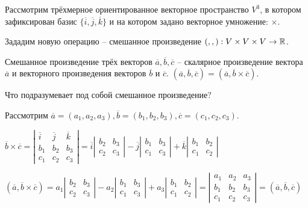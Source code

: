 	Рассмотрим трёхмерное ориентированное векторное пространство $V^3$, в котором зафиксирован базис $\{\overline{i}, \overline{j}, \overline{k}\}$ и на котором задано векторное умножение: $\times$.

	Зададим новую операцию -- смешанное произведение $(,,): V \times V \times V \to \mathbb{R}$. 

	\begin{Def}
		Смешанное произведение трёх векторов $\overline{a}, \overline{b}, \overline{c}$ -- скалярное произведение вектора $\overline{a}$ и векторного произведения векторов $\overline{b}$ и $\overline{c}$. $(\overline{a}, \overline{b}, \overline{c}) = (\overline{a}, \overline{b} \times \overline{c}).$
	\end{Def}

	\begin{Example}
		Что подразумевает под собой смешанное произведение?
		
		Рассмотрим $\overline{a} = (a_1, a_2, a_3), \overline{b} = (b_1, b_2, b_3), \overline{c} = (c_1, c_2, c_3) $.
		
		$\overline{b} \times \overline{c} = 
		\left|\begin{array}{cccc}
			\overline{i}  & \overline{j}  & \overline{k}  \\ 
			b_1 &  b_2 & b_3 \\ 
			c_1 & c_2 & c_3
			\end{array}\right| = \overline{i} 
		\left|\begin{array}{cccc}
			b_2 & b_3 \\ 
			c_2 & c_3
			\end{array}\right| - \overline{j}
		\left|\begin{array}{cccc}
			b_1 & b_3 \\ 
			c_1 & c_3
			\end{array}\right| + \overline{k}
		\left|\begin{array}{cccc}
			b_1 & b_2 \\ 
			c_1 & c_2
			\end{array}\right| $
		
			$(\overline{a}, \overline{b} \times \overline{c}) = a_1
		\left|\begin{array}{cccc}
		b_2 & b_3 \\ 
		c_2 & c_3
		\end{array}\right| - 
		a_2 \left|\begin{array}{cccc}
			b_1 & b_3 \\ 
			c_1 & c_3
			\end{array}\right| + 
		a_3  \left|\begin{array}{cccc}
			b_1 & b_2 \\ 
			c_1 & c_2
			\end{array}\right| = 
		\left|\begin{array}{cccc}
			a_1  & a_2  & a_3  \\ 
			b_1 &  b_2 & b_3 \\ 
			c_1 & c_2 & c_3
			\end{array}\right| = (\overline{a}, \overline{b}, \overline{c})$


\end{Example}
